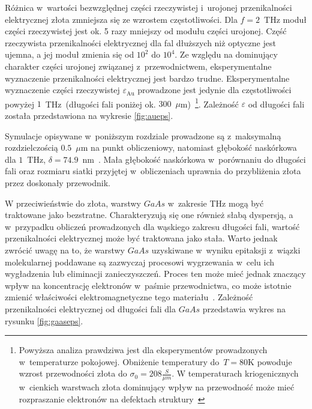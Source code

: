 Różnica w~wartości bezwzględnej części rzeczywistej i~urojonej przenikalności elektrycznej złota zmniejsza się ze wzrostem częstotliwości. Dla $f=2$~THz moduł części rzeczywistej jest ok. 5 razy mniejszy od modułu części urojonej. Część rzeczywista przenikalności elektrycznej dla fal dłuższych niż optyczne jest ujemna, a jej moduł zmienia się od $10^2$ do $10^4$. Ze względu na dominujący charakter części urojonej związanej z~przewodnictwem, eksperymentalne wyznaczenie przenikalności elektrycznej jest bardzo trudne. Eksperymentalne wyznaczenie części rzeczywistej $\varepsilon_{\textrm{Au}}$ prowadzone jest jedynie dla częstotliwości powyżej $1$~THz~(długości fali poniżej ok. $300$~$\mu$m)~\cite{ordal1983optical}\footnote{Powyższa analiza prawdziwa jest dla eksperymentów prowadzonych w~temperaturze pokojowej. Obniżenie temperatury do~$T=$80K powoduje wzrost przewodności złota do $\sigma_0=208\frac{S}{\mu m}$. W temperaturach kriogenicznych w~cienkich warstwach złota dominujący wpływ na przewodność może mieć rozpraszanie elektronów na defektach struktury~\cite{lide2009crc}}. Zależność $\varepsilon$ od długości fali została przedstawiona na wykresie \ref{fig:aueps}. 

Symulacje opisywane w~poniższym rozdziale prowadzone są z~maksymalną rozdzielczością $0.5$~$\mu$m na punkt obliczeniowy, natomiast głębokość naskórkowa dla $1$~THz, $\delta=74.9$~nm~\cite{lee2009principles}. Mała głębokość naskórkowa w~porównaniu do długości fali oraz rozmiaru siatki przyjętej w~obliczeniach uprawnia do przybliżenia złota przez doskonały przewodnik. 

W przeciwieństwie do złota, warstwy $GaAs$ w~zakresie THz mogą być traktowane jako bezstratne. Charakteryzują się one również słabą dyspersją, a w~przypadku obliczeń prowadzonych dla wąskiego zakresu długości fali, wartość przenikalności elektrycznej może być traktowana jako stała. Warto jednak zwrócić uwagę na to, że warstwy $GaAs$ uzyskiwane w~wyniku epitaksji z~wiązki molekularnej poddawane są zazwyczaj procesowi wygrzewania w~celu ich wygładzenia lub eliminacji zanieczyszczeń. Proces ten może mieć jednak znaczący wpływ na koncentrację elektronów w~paśmie przewodnictwa, co może istotnie zmienić właściwości elektromagnetyczne tego materiału~\cite{zhang2009annealing}. Zależność przenikalności elektrycznej od długości fali dla $GaAs$ przedstawia wykres na rysunku \ref{fig:gaaseps}.
